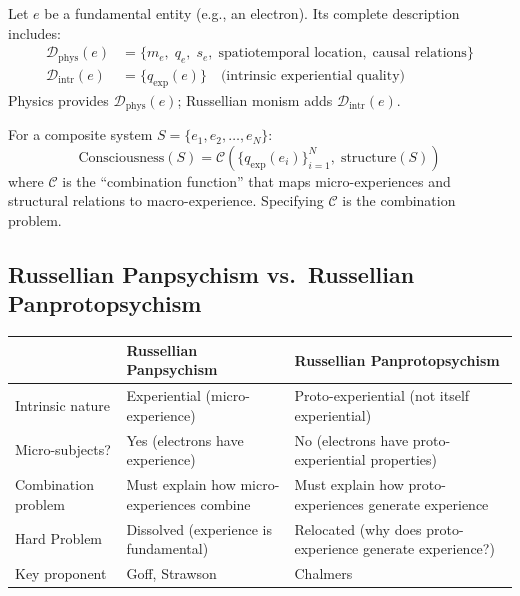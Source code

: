 \documentclass[11pt,a4paper]{report}
\begin{document}
\begin{mathbox}
\vspace{-6pt}
Let $e$ be a fundamental entity (e.g., an electron). Its complete description includes:
\begin{align*}
  \mathcal{D}_{\text{phys}}(e) &= \{m_e,\; q_e,\; s_e,\; \text{spatiotemporal location},\; \text{causal relations}\} \\
  \mathcal{D}_{\text{intr}}(e) &= \{q_{\text{exp}}(e)\} \quad \text{(intrinsic experiential quality)}
\end{align*}
Physics provides $\mathcal{D}_{\text{phys}}(e)$; Russellian monism adds $\mathcal{D}_{\text{intr}}(e)$.

For a composite system $S = \{e_1, e_2, \ldots, e_N\}$:
\[
  \text{Consciousness}(S) = \mathcal{C}\!\left(\{q_{\text{exp}}(e_i)\}_{i=1}^{N},\; \text{structure}(S)\right)
\]
where $\mathcal{C}$ is the ``combination function'' that maps micro-experiences and structural relations to macro-experience. Specifying $\mathcal{C}$ is the combination problem.
\vspace{-4pt}
\end{mathbox}

\subsection{Russellian Panpsychism vs.\ Russellian Panprotopsychism}

\begin{center}
\renewcommand{\arraystretch}{1.4}
\begin{tabular}{>{\raggedright}p{3.5cm} >{\raggedright}p{5.5cm} >{\raggedright\arraybackslash}p{4.5cm}}
  \toprule
  & \textbf{Russellian Panpsychism} & \textbf{Russellian Panprotopsychism} \\
  \midrule
  Intrinsic nature & Experiential (micro-experience) & Proto-experiential (not itself experiential) \\
  Micro-subjects? & Yes (electrons have experience) & No (electrons have proto-experiential properties) \\
  Combination problem & Must explain how micro-experiences combine & Must explain how proto-experiences generate experience \\
  Hard Problem & Dissolved (experience is fundamental) & Relocated (why does proto-experience generate experience?) \\
  Key proponent & Goff, Strawson & Chalmers \\
  \bottomrule
\end{tabular}
\end{center}
\end{document}
